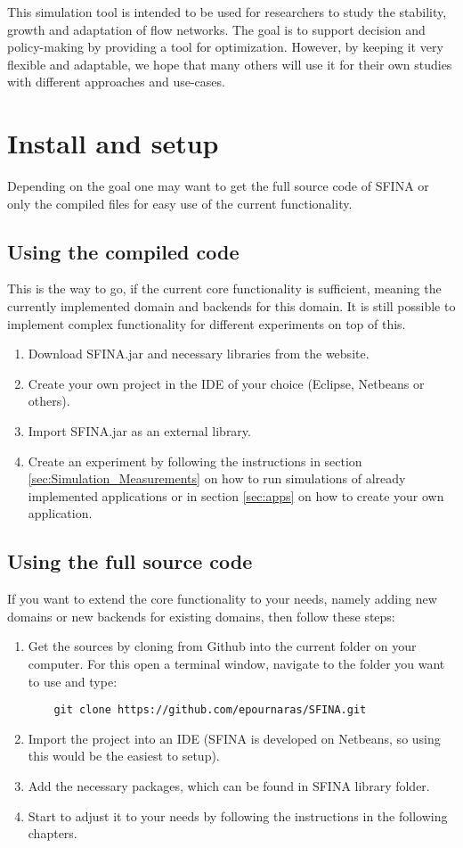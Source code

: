 \documentclass[11pt,fleqn]{book} %
\begin{document}
This simulation tool is intended to be used for researchers to study the stability, growth and adaptation of flow networks. The goal is to support decision and policy-making by providing a tool for optimization. However, by keeping it very flexible and adaptable, we hope that many others will use it for their own studies with different approaches and use-cases.

\section{Install and setup}
Depending on the goal one may want to get the full source code of SFINA or only the compiled files for easy use of the current functionality.

\subsection{Using the compiled code}
This is the way to go, if the current core functionality is sufficient, meaning the currently implemented domain and backends for this domain. It is still possible to implement complex functionality for different experiments on top of this.

\begin{enumerate}
	\item Download SFINA.jar and necessary libraries from the website.
	\item Create your own project in the IDE of your choice (Eclipse, Netbeans or others).
	\item Import SFINA.jar as an external library.
	\item Create an experiment by following the instructions in section \ref{sec:Simulation_Measurements} on how to run simulations of already implemented applications or in section \ref{sec:apps} on how to create your own application.
\end{enumerate}

\subsection{Using the full source code}
If you want to extend the core functionality to your needs, namely adding new domains or new backends for existing domains, then follow these steps:
\begin{enumerate}
	\item Get the sources by cloning from Github into the current folder on your computer. For this open a terminal window, navigate to the folder you want to use and type: 
	\begin{lstlisting}
	git clone https://github.com/epournaras/SFINA.git
	\end{lstlisting}
	\item Import the project into an IDE (SFINA is developed on Netbeans, so using this would be the easiest to setup).
	\item Add the necessary packages, which can be found in SFINA library folder.
	\item Start to adjust it to your needs by following the instructions in the following chapters.
\end{enumerate}
\end{document}
